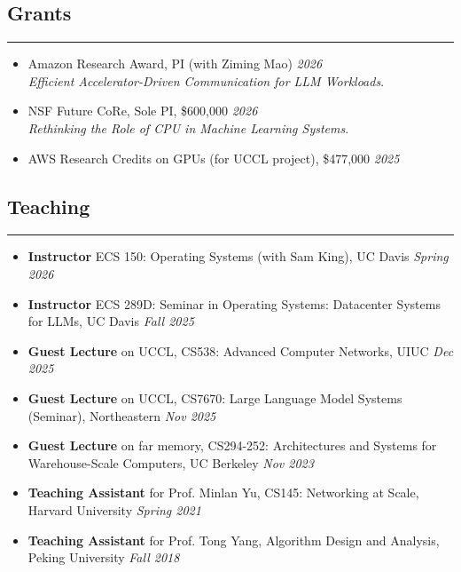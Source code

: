 \documentclass[letterpaper, 11pt]{article}
\newcommand\toRight{\hspace*{0pt}\hfill}
\begin{document}
\subsection*{\sc Grants}
\hrule
\vspace{0.2cm}
\begin{itemize}
    \setlength{\itemsep}{0pt}%
    \setlength{\parskip}{2pt}%
	\item Amazon Research Award, PI (with Ziming Mao) \toRight \textit{2026} \\
        \emph{Efficient Accelerator-Driven Communication for LLM Workloads}.
	\item NSF Future CoRe, Sole PI, \$600,000 \toRight \textit{2026} \\
        \emph{Rethinking the Role of CPU in Machine Learning Systems}.
	\item AWS Research Credits on GPUs (for UCCL project), \$477,000 \toRight \textit{2025}
\end{itemize}

\subsection*{\sc Teaching}
\hrule
\vspace{0.2cm}
\begin{itemize}
    \setlength{\itemsep}{0pt}%
    \setlength{\parskip}{2pt}%
    \item {\bf Instructor} ECS 150: Operating Systems  (with Sam King), UC Davis \toRight \textit{Spring 2026}
    \item {\bf Instructor} ECS 289D: Seminar in Operating Systems: Datacenter Systems for LLMs, UC Davis \toRight \textit{Fall 2025}
    \item {\bf Guest Lecture} on UCCL, CS538: Advanced Computer Networks, UIUC \toRight \textit{Dec 2025}
    \item {\bf Guest Lecture} on UCCL, CS7670: Large Language Model Systems (Seminar), Northeastern \toRight \textit{Nov 2025}
    \item {\bf Guest Lecture} on far memory, CS294-252: Architectures and Systems for Warehouse-Scale Computers, UC Berkeley \toRight \textit{Nov 2023}
    \item {\bf Teaching Assistant} for Prof. Minlan Yu, CS145: Networking at Scale, Harvard University \toRight \textit{Spring 2021}
    \item {\bf Teaching Assistant} for Prof. Tong Yang, Algorithm Design and Analysis, Peking University \toRight \textit{Fall 2018}
\end{itemize}
\end{document}
